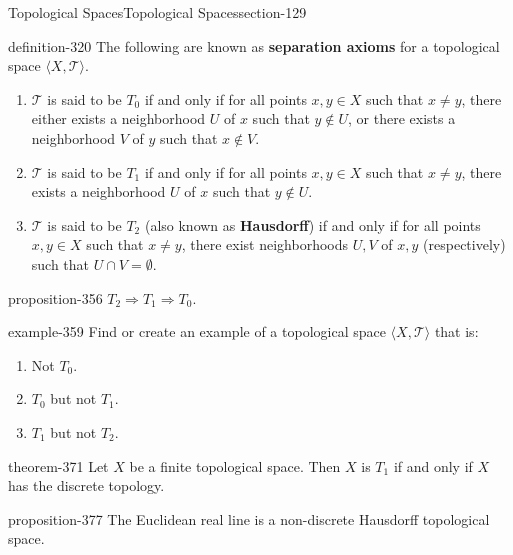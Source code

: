 \documentclass[oneside,10pt,]{article}
\newcommand{\terminology}[1]{\textbf{#1}}
\newcommand{\tuple}[1]{\langle #1 \rangle}
\newcommand{\mc}{\mathcal}
\begin{document}
\begin{sectionptx}{Topological Spaces}{}{Topological Spaces}{}{}{section-129}
\begin{definition}{}{definition-320}%
\hypertarget{p-321}{}%
The following are known as \terminology{separation axioms} for a topological space \(\tuple{X,\mc T}\).%
\leavevmode%
\begin{enumerate}
\item\hypertarget{li-325}{}\(\mc T\) is said to be \terminology{\(T_0\)} if and only if for all points \(x,y\in X\) such that \(x\not=y\), there either exists a neighborhood \(U\) of \(x\) such that \(y\not\in U\), or there exists a neighborhood \(V\) of \(y\) such that \(x\not\in V\).%
\item\hypertarget{li-337}{}\(\mc T\) is said to be \terminology{\(T_1\)} if and only if for all points \(x,y\in X\) such that \(x\not=y\), there exists a neighborhood \(U\) of \(x\) such that \(y\not\in U\).%
\item\hypertarget{li-346}{}\(\mc T\) is said to be \terminology{\(T_2\)} (also known as \terminology{Hausdorff}) if and only if for all points \(x,y\in X\) such that \(x\not=y\), there exist neighborhoods \(U,V\) of \(x,y\) (respectively) such that \(U\cap V=\emptyset\).%
\end{enumerate}
\end{definition}
\begin{proposition}{}{}{proposition-356}%
\hypertarget{p-357}{}%
\(T_2\Rightarrow T_1\Rightarrow T_0\).%
\end{proposition}
\begin{example}{}{example-359}%
\hypertarget{p-360}{}%
Find or create an example of a topological space \(\tuple{X,\mc T}\) that is:%
\leavevmode%
\begin{enumerate}
\item\hypertarget{li-363}{}Not \(T_0\).%
\item\hypertarget{li-365}{}\(T_0\) but not \(T_1\).%
\item\hypertarget{li-368}{}\(T_1\) but not \(T_2\).%
\end{enumerate}
\end{example}
\begin{theorem}{}{}{theorem-371}%
\hypertarget{p-372}{}%
Let \(X\) be a finite topological space. Then \(X\) is \(T_1\) if and only if \(X\) has the discrete topology.%
\end{theorem}
\begin{proposition}{}{}{proposition-377}%
\hypertarget{p-378}{}%
The Euclidean real line is a non-discrete Hausdorff topological space.%
\end{proposition}

\end{sectionptx}
\end{document}
